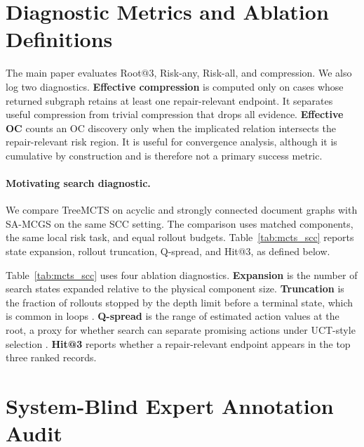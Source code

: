 \documentclass[11pt]{article}
\makeatletter
\newcommand{\samcgs}{SA-MCGS}
\newcommand{\riskany}{Risk-any}
\newcommand{\riskall}{Risk-all}
\newcommand{\rootthree}{Root@3}
\newcommand{\scc}{SCC}
\newcommand{\oc}{OC}
\makeatother
\begin{document}
\appendix
\raggedbottom


\section{Diagnostic Metrics and Ablation Definitions}
\label{app:diagnostics}

The main paper evaluates \rootthree{}, \riskany{}, \riskall{}, and
compression.  We also log two diagnostics.  \textbf{Effective
compression} is computed only on cases whose returned subgraph retains at
least one repair-relevant endpoint.  It separates useful compression from
trivial compression that drops all evidence.  \textbf{Effective \oc{}}
counts an \oc{} discovery only when the implicated relation intersects
the repair-relevant risk region.  It is useful for convergence analysis,
although it is cumulative by construction and is therefore not a primary
success metric.

\begin{revredblock}
\paragraph{Motivating search diagnostic.}
We compare TreeMCTS on acyclic and strongly connected document graphs with \samcgs{} on the same \scc{} setting. The comparison uses matched components, the same local risk task, and equal rollout budgets. Table~\ref{tab:mcts_scc} reports state expansion, rollout truncation, Q-spread, and Hit@3, as defined below.


\end{revredblock}

Table~\ref{tab:mcts_scc} uses four ablation diagnostics.  \textbf{Expansion}
is the number of search states expanded relative to the physical
component size.  \textbf{Truncation} is the fraction of rollouts stopped
by the depth limit before a terminal state, which is common in loops
\citep{moerland2020mcts}.  \textbf{Q-spread} is the range of estimated
action values at the root, a proxy for whether search can separate
promising actions under UCT-style selection \citep{kocsis2006bandit}.
\textbf{Hit@3} reports whether a repair-relevant endpoint appears in the
top three ranked records.

\section{System-Blind Expert Annotation Audit}
\label{sec:appendix_annotation}

\end{document}

